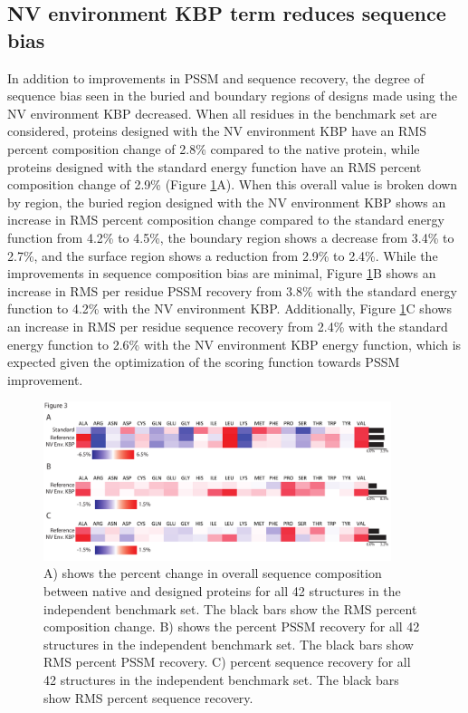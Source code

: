\subsection{\acs{NV} environment \acs{KBP} term reduces sequence bias}
In addition to improvements in \ac{PSSM} and sequence recovery, the degree of sequence bias seen in the buried and boundary regions of designs made using the \ac{NV} environment \ac{KBP} decreased.
When all residues in the benchmark set are considered, proteins designed with the \ac{NV} environment \ac{KBP} have an \ac{RMS} percent composition change of 2.8\% compared to the native protein, while proteins designed with the standard energy function have an \ac{RMS} percent composition change of 2.9\% (Figure \ref{fig:overall_independent_changes}A).
When this overall value is broken down by region, the buried region designed with the \ac{NV} environment \ac{KBP} shows an increase in \ac{RMS} percent composition change compared to the standard energy function from 4.2\% to 4.5\%, the boundary region shows a decrease from 3.4\% to 2.7\%, and the surface region shows a reduction from 2.9\% to 2.4\%.
While the improvements in sequence composition bias are minimal, Figure \ref{fig:overall_independent_changes}B shows an increase in \ac{RMS} per residue \ac{PSSM} recovery from 3.8\% with the standard energy function to 4.2\% with the \ac{NV} environment \ac{KBP}.
Additionally, Figure \ref{fig:overall_independent_changes}C shows an increase in \ac{RMS} per residue sequence recovery from 2.4\% with the standard energy function to 2.6\% with the \ac{NV} environment \ac{KBP} energy function, which is expected given the optimization of the scoring function towards \ac{PSSM} improvement. 

\begin{figure}
\centering
\includegraphics[width=4in]{figures/nv_kbp/overall_independent_changes}
\caption{
A) shows the percent change in overall sequence composition between native and designed proteins for all 42 structures in the independent benchmark set.
The black bars show the \acs{RMS} percent composition change. 
B) shows the percent \acs{PSSM} recovery for all 42 structures in the independent benchmark set.
The black bars show \acs{RMS} percent \acs{PSSM} recovery.  
C) percent sequence recovery for all 42 structures in the independent benchmark set.
The black bars show \acs{RMS} percent sequence recovery.
}
\label{fig:overall_independent_changes}
\end{figure}

